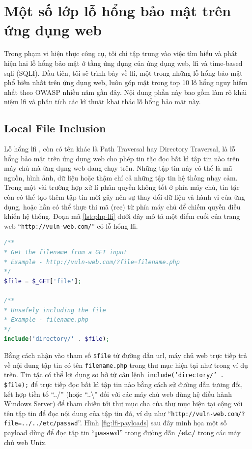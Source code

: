 \chapter{Một số lớp lỗ hổng bảo mật trên ứng dụng web}
Trong phạm vi hiện thực công cụ, tôi chỉ tập trung vào việc tìm hiểu và phát hiện hai lỗ hổng bảo mật ở tầng ứng dụng của ứng dụng web, \acrfull{lfi} và time-based \acrlong{sqli} (SQLI). Đầu tiên, tôi sẽ trình bày về \acrfull{lfi}, một trong những lỗ hổng bảo mật phổ biến nhất trên ứng dụng web, luôn góp mặt trong top 10 lỗ hổng nguy hiểm nhất theo OWASP \parencite{owasp-top-10} nhiều năm gần đây. Nội dung phần này bao gồm làm rõ khái niệm \acrshort{lfi} và phân tích các kĩ thuật khai thác lỗ hổng bảo mật này.
\section{Local File Inclusion}
Lỗ hổng \acrfull{lfi} \parencite{portswigger-directory-traversal, owasp-path-traversal, sullivan2011web}, còn có tên khác là Path Traversal hay Directory Traversal, là lỗ hổng bảo mật trên ứng dụng web cho phép tin tặc đọc bất kì tập tin nào trên máy chủ mà ứng dụng web đang chạy trên. Những tập tin này có thể là mã nguồn, hình ảnh, dữ liệu hoặc thậm chí cả những tập tin hệ thống nhạy cảm. Trong một vài trường hợp xử lí phân quyền không tốt ở phía máy chủ, tin tặc còn có thể tạo thêm tập tin mới gây nên sự thay đổi dữ liệu và hành vi của ứng dụng, hoặc hắn có thể thực thi mã (\acrshort{rce}) từ phía máy chủ để chiếm quyền điều khiển hệ thống. Đoạn mã \ref{lst:php-lfi} dưới đây mô tả một điểm cuối của trang web ``\texttt{http://vuln-web.com/}'' có lỗ hổng \acrshort{lfi}.
\begin{lstlisting}[language=php, label={lst:php-lfi},caption={Đoạn mã PHP có lỗ hổng Local File Inclusion}]
/**
* Get the filename from a GET input
* Example - http://vuln-web.com/?file=filename.php
*/
$file = $_GET['file'];

/**
* Unsafely including the file
* Example - filename.php
*/
include('directory/' . $file);
\end{lstlisting}
Bằng cách nhận vào tham số \texttt{\$file} từ đường dẫn \acrshort{url}, máy chủ web trực tiếp trả về nội dung tập tin có tên \texttt{filename.php} trong thư mục hiện tại như trong ví dụ trên. Tin tặc có thể lợi dụng sơ hở từ câu lệnh \texttt{include('directory/' . \$file);} để trực tiếp đọc bất kì tập tin nào bằng cách sử đường dẫn tương đối, kết hợp tiền tố ``../'' (hoặc ``..\textbackslash'' đối với các máy chủ web dùng hệ điều hành Windows Server) để tham chiếu tới thư mục cha của thư mục hiện tại cộng với tên tập tin để đọc nội dung của tập tin đó, ví dụ như ``\texttt{http://vuln-web.com/?file=../../etc/passwd}''. Hình \ref{fig:lfi-payloads} sau đây minh họa một số payload dùng để đọc tập tin ``\textbf{passwd}'' trong đường dẫn \textbf{/etc/} trong các máy chủ web Unix.

